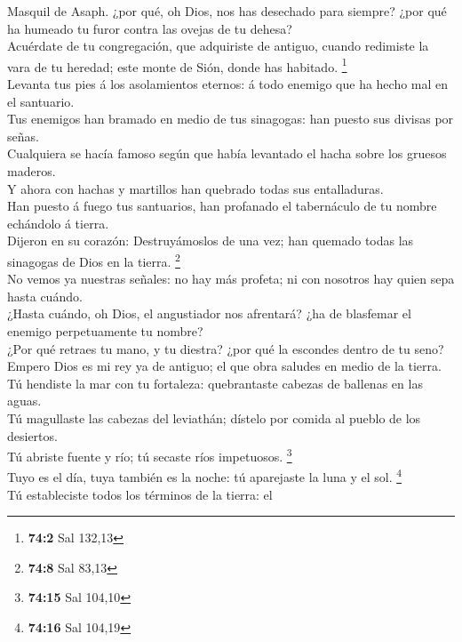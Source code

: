  Masquil de Asaph. ¿por qué, oh Dios, nos has desechado
para siempre? ¿por qué ha humeado tu furor contra las ovejas de tu
dehesa?\\
 Acuérdate de tu congregación, que adquiriste de antiguo,
cuando redimiste la vara de tu heredad; este monte de Sión, donde has
habitado. \footnote{\textbf{74:2} Sal 132,13}\\
 Levanta tus pies á los asolamientos eternos: á todo
enemigo que ha hecho mal en el santuario.\\
 Tus enemigos han bramado en medio de tus sinagogas: han
puesto sus divisas por señas.\\
 Cualquiera se hacía famoso según que había levantado el
hacha sobre los gruesos maderos.\\
 Y ahora con hachas y martillos han quebrado todas sus
entalladuras.\\
 Han puesto á fuego tus santuarios, han profanado el
tabernáculo de tu nombre echándolo á tierra.\\
 Dijeron en su corazón: Destruyámoslos de una vez; han
quemado todas las sinagogas de Dios en la tierra. \footnote{\textbf{74:8}
  Sal 83,13}\\
 No vemos ya nuestras señales: no hay más profeta; ni con
nosotros hay quien sepa hasta cuándo.\\
 ¿Hasta cuándo, oh Dios, el angustiador nos afrentará?
¿ha de blasfemar el enemigo perpetuamente tu nombre?\\
 ¿Por qué retraes tu mano, y tu diestra? ¿por qué la
escondes dentro de tu seno?\\
 Empero Dios es mi rey ya de antiguo; el que obra saludes
en medio de la tierra.\\
 Tú hendiste la mar con tu fortaleza: quebrantaste
cabezas de ballenas en las aguas.\\
 Tú magullaste las cabezas del leviathán; dístelo por
comida al pueblo de los desiertos.\\
 Tú abriste fuente y río; tú secaste ríos impetuosos.
\footnote{\textbf{74:15} Sal 104,10}\\
 Tuyo es el día, tuya también es la noche: tú aparejaste
la luna y el sol. \footnote{\textbf{74:16} Sal 104,19}\\
 Tú estableciste todos los términos de la tierra: el
